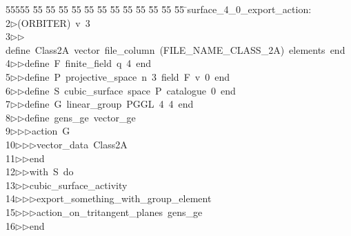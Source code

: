 %
%
\begin{tabbing}
55555 \= 55 \= 55 \= 55 \= 55 \= 55 \= 55 \= 55 \= 55 \= 55 \= 55 \= 55 \= 55 \= \>surface\_4\_0\_export\_action:\\[0pt]
2\>$\triangleright$\>(ORBITER)\ v\ 3\ \\[0pt]
3\>$\triangleright$\>$\triangleright$\>define\ Class2A\ vector\ file\_column\ (FILE\_NAME\_CLASS\_2A)\ elements\ end\ \\[0pt]
4\>$\triangleright$\>$\triangleright$\>define\ F\ finite\_field\ q\ 4\ end\ \\[0pt]
5\>$\triangleright$\>$\triangleright$\>define\ P\ projective\_space\ n\ 3\ field\ F\ v\ 0\ end\ \\[0pt]
6\>$\triangleright$\>$\triangleright$\>define\ S\ cubic\_surface\ space\ P\ catalogue\ 0\ end\ \\[0pt]
7\>$\triangleright$\>$\triangleright$\>define\ G\ linear\_group\ PGGL\ 4\ 4\ end\ \\[0pt]
8\>$\triangleright$\>$\triangleright$\>define\ gens\_ge\ vector\_ge\ \\[0pt]
9\>$\triangleright$\>$\triangleright$\>$\triangleright$\>action\ G\ \\[0pt]
10\>$\triangleright$\>$\triangleright$\>$\triangleright$\>vector\_data\ Class2A\ \\[0pt]
11\>$\triangleright$\>$\triangleright$\>end\ \\[0pt]
12\>$\triangleright$\>$\triangleright$\>with\ S\ do\ \\[0pt]
13\>$\triangleright$\>$\triangleright$\>cubic\_surface\_activity\ \\[0pt]
14\>$\triangleright$\>$\triangleright$\>$\triangleright$\>export\_something\_with\_group\_element\ \\[0pt]
15\>$\triangleright$\>$\triangleright$\>$\triangleright$\>action\_on\_tritangent\_planes\ gens\_ge\ \\[0pt]
16\>$\triangleright$\>$\triangleright$\>end\ \\[0pt]

\end{tabbing}
